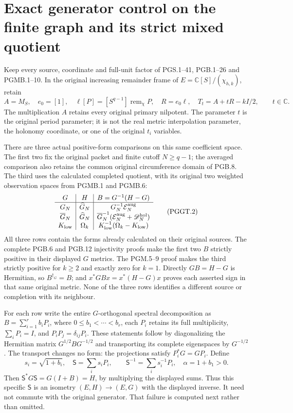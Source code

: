 \section{Exact generator control on the finite graph and its strict mixed quotient}
\label{GraphV2:sec:pggt}

Keep every source, coordinate and full-unit factor of
PGS.1--41, PGB.1--26 and PGMB.1--10. In the original increasing
remainder frame of $E=\mathbb{C}[S]/(\chi_{h,k})$, retain
\[
 A=M_S,\quad e_0=[1],\quad
 \ell[P]=[S^{q-1}]\operatorname{rem}_{\chi}P,\quad
 R=e_0\ell,\quad T_t=A+tR-kI/2,\qquad t\in\mathbb{C}.
 \tag{PGGT.1}\label{GraphV2:eq:pggt-original-generator}
\]
The multiplication $A$ retains every original primary
nilpotent. The parameter $t$ is the original period parameter;
it is not the real metric interpolation parameter, the
holonomy coordinate, or one of the original $t_i$ variables.

There are three actual positive-form comparisons on this same
coefficient space. The first two fix the original packet and
finite cutoff $N\geq q-1$; the averaged comparison also retains
the common original circumference domain of PGB.8. The third
uses the calculated completed quotient, with its original
two weighted observation spaces from PGMB.1 and PGMB.6:
\[
\begin{array}{c|c|c}
 G&H&B=G^{-1}(H-G)\\ \hline
 G_N&\widehat G_N&G_N^{-1}\mathcal E_N^{\rm aug}\\
 \overline G_N&\widehat G_N&
 \overline G_N^{-1}(\mathcal E_N^{\rm aug}+\mathscr D_N^{\rm hol})\\
 K_{\rm low}&\Omega_k&K_{\rm low}^{-1}
                                  (\Omega_k-K_{\rm low})
\end{array}
\tag{PGGT.2}\label{GraphV2:eq:pggt-three-comparisons}
\]
All three rows contain the forms already calculated on their
original sources. The complete PGB.6 and PGB.12 injectivity
proofs make the first two $B$ strictly positive in their
displayed $G$ metrics. The PGM.5--9 proof makes the third
strictly positive for $k\geq2$ and exactly zero for $k=1$.
Directly $GB=H-G$ is Hermitian, so $B^{\dagger_G}=B$;
and $x^*GBx=x^*(H-G)x$ proves each asserted sign in that
same original metric. None of the three rows identifies a
different source or completion with its neighbour.

For each row write the entire $G$-orthogonal spectral
decomposition as $B=\sum_{i=1}^r b_iP_i$, where
$0\leq b_1<\cdots<b_r$, each $P_i$ retains its full
multiplicity, $\sum_iP_i=I$, and $P_iP_j=\delta_{ij}P_i$.
These statements follow by diagonalizing the Hermitian
matrix $G^{1/2}BG^{-1/2}$ and transporting its complete
eigenspaces by $G^{-1/2}$. The transport changes no form:
the projections satisfy $P_i^*G=GP_i$. Define
\[
 s_i=\sqrt{1+b_i},\quad
 \mathsf S=\sum_i s_iP_i,\qquad
 \mathsf S^{-1}=\sum_i s_i^{-1}P_i,\quad
 \alpha=1+b_1>0.
 \tag{PGGT.3}\label{GraphV2:eq:pggt-exact-isometry}
\]
Then $\mathsf S^*G\mathsf S=G(I+B)=H$, by multiplying
the displayed sums. Thus this specific $\mathsf S$ is an
isometry $(E,H)\to(E,G)$ with the displayed inverse.
It need not commute with the original generator. That
failure is computed next rather than omitted.

